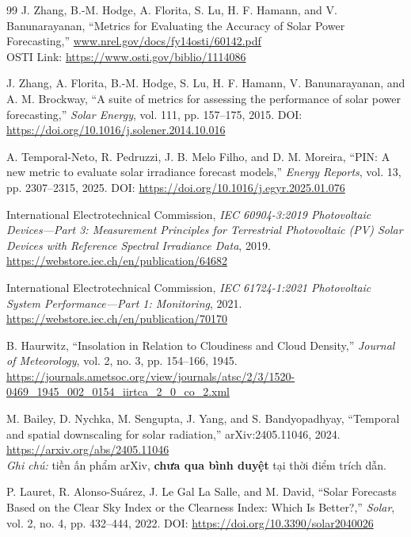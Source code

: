 \documentclass[12pt,a4paper]{article}
\begin{document}
\begin{thebibliography}{99}
J. Zhang, B.-M. Hodge, A. Florita, S. Lu, H. F. Hamann, and V. Banunarayanan,
``Metrics for Evaluating the Accuracy of Solar Power Forecasting,''
\href{https://www.nrel.gov/docs/fy14osti/60142.pdf}{www.nrel.gov/docs/fy14osti/60142.pdf} \\ OSTI Link: \url{https://www.osti.gov/biblio/1114086}

J. Zhang, A. Florita, B.-M. Hodge, S. Lu, H. F. Hamann, V. Banunarayanan, and A. M. Brockway,
``A suite of metrics for assessing the performance of solar power forecasting,''
\textit{Solar Energy}, vol. 111, pp. 157--175, 2015.
DOI: \url{https://doi.org/10.1016/j.solener.2014.10.016}

A. Temporal-Neto, R. Pedruzzi, J. B. Melo Filho, and D. M. Moreira,
``PIN: A new metric to evaluate solar irradiance forecast models,''
\textit{Energy Reports}, vol. 13, pp. 2307--2315, 2025.
DOI: \url{https://doi.org/10.1016/j.egyr.2025.01.076}

International Electrotechnical Commission,
\textit{IEC 60904-3:2019 Photovoltaic Devices---Part 3: Measurement Principles for Terrestrial Photovoltaic (PV) Solar Devices with Reference Spectral Irradiance Data}, 2019.
\url{https://webstore.iec.ch/en/publication/64682}

International Electrotechnical Commission,
\textit{IEC 61724-1:2021 Photovoltaic System Performance---Part 1: Monitoring}, 2021.
\url{https://webstore.iec.ch/en/publication/70170}

B. Haurwitz,
``Insolation in Relation to Cloudiness and Cloud Density,''
\textit{Journal of Meteorology}, vol. 2, no. 3, pp. 154--166, 1945.
\url{https://journals.ametsoc.org/view/journals/atsc/2/3/1520-0469_1945_002_0154_iirtca_2_0_co_2.xml}

M. Bailey, D. Nychka, M. Sengupta, J. Yang, and S. Bandyopadhyay,
``Temporal and spatial downscaling for solar radiation,'' arXiv:2405.11046, 2024.
\url{https://arxiv.org/abs/2405.11046}
\\ \textit{Ghi chú:} tiền ấn phẩm arXiv, \textbf{chưa qua bình duyệt} tại thời điểm trích dẫn.

P. Lauret, R. Alonso-Suárez, J. Le Gal La Salle, and M. David,
``Solar Forecasts Based on the Clear Sky Index or the Clearness Index: Which Is Better?,''
\textit{Solar}, vol. 2, no. 4, pp. 432--444, 2022.
DOI: \url{https://doi.org/10.3390/solar2040026}


\end{thebibliography}
\end{document}
